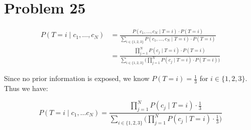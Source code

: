 \documentclass[12pt]{article}
\begin{document}
\section{Problem 25}

\begin{align*}
    P(T = i \mid c_1, \dots, c_N) &= \frac{P(c_1, \dots, c_N \mid T = i)\cdot P(T = i)}{\sum\limits_{i \in \{1, 2, 3\}} P(c_1, \dots, c_N \mid T = i) \cdot P(T = i)} \\
    &= \frac{\prod\limits_{j = 1}^{N} P(c_j \mid T = i) \cdot P(T = i) }{\sum\limits_{i \in \{1, 2, 3\}} \big ( \prod\limits_{j = 1}^{N} P(c_j \mid T = i) \cdot P(T = i)\big ) }
\end{align*}

Since no prior information is exposed, we know $P(T = i) = \frac{1}{3}$ for $i \in \{1, 2, 3\}$. Thus we have:

\begin{equation*}
    P(T = i \mid c_1, \dots c_N) = \frac{\prod\limits_{j = 1}^{N} P(c_j \mid T = i) \cdot \frac{1}{3} }{\sum\limits_{i \in \{1, 2, 3\}} \big ( \prod\limits_{j = 1}^{N} P(c_j \mid T = i) \cdot \frac{1}{3} \big ) }
\end{equation*}
\end{document}
